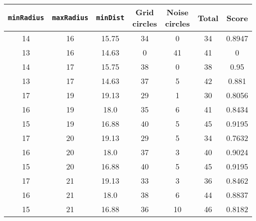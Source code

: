 \documentclass[letterpaper, 12pt]{article}
\begin{document}
\begin{longtable}{|c|c|c|c|c|c|c|}
\hline
\textbf{\texttt{minRadius}} & \textbf{\texttt{maxRadius}} & \textbf{\texttt{minDist}} & \textbf{Grid circles} & \textbf{Noise circles} & \textbf{Total} & \textbf{Score} \\
\hline
14 & 16 & 15.75 & 34 & 0 & 34 & 0.8947 \\
\hline
13 & 16 & 14.63 & 0 & 41 & 41 & 0 \\
\hline
14 & 17 & 15.75 & 38 & 0 & 38 & 0.95 \\
\hline
13 & 17 & 14.63 & 37 & 5 & 42 & 0.881 \\
\hline
17 & 19 & 19.13 & 29 & 1 & 30 & 0.8056 \\
\hline
16 & 19 & 18.0 & 35 & 6 & 41 & 0.8434 \\
\hline
15 & 19 & 16.88 & 40 & 5 & 45 & 0.9195 \\
\hline
17 & 20 & 19.13 & 29 & 5 & 34 & 0.7632 \\
\hline
16 & 20 & 18.0 & 37 & 3 & 40 & 0.9024 \\
\hline
15 & 20 & 16.88 & 40 & 5 & 45 & 0.9195 \\
\hline
17 & 21 & 19.13 & 33 & 3 & 36 & 0.8462 \\
\hline
16 & 21 & 18.0 & 38 & 6 & 44 & 0.8837 \\
\hline
15 & 21 & 16.88 & 36 & 10 & 46 & 0.8182 \\
\hline
\end{longtable}
\end{document}
